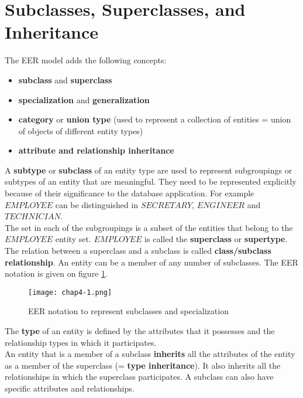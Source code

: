 \section{Subclasses, Superclasses, and Inheritance}

The EER model adds the following concepts:\\

\begin{itemize}
    \item \textbf{subclass} and \textbf{superclass}
    \item \textbf{specialization} and \textbf{generalization}
    \item \textbf{category} or \textbf{union type} (used to represent a collection of entities = union of objects of different entity types)
    \item \textbf{attribute and relationship inheritance}
\end{itemize}

A \textbf{subtype} or \textbf{subclass} of an entity type are used to represent subgroupings or subtypes of an entity that are meaningful. They need to be represented explicitly because of their significance to the database application. For example $EMPLOYEE$ can be distinguished in $SECRETARY$, $ENGINEER$ and $TECHNICIAN$.\\

The set in each of the subgroupings is a subset of the entities that belong to the $EMPLOYEE$ entity set. $EMPLOYEE$ is called the \textbf{superclass} or \textbf{supertype}. The relation between a superclass and a subclass is called \textbf{class/subclass relationship}. An entity can be a member of any number of subclasses. The EER notation is given on figure \ref{fig:subclasses}.\\

\begin{figure}[!h]
    \centering
    \texttt{[image: chap4-1.png]}
    \caption{EER notation to represent subclasses and specialization}
    \label{fig:subclasses}
\end{figure}

The \textbf{type} of an entity is defined by the attributes that it possesses and the relationship types in which it participates.\\

An entity that is a member of a subclass \textbf{inherits} all the attributes of the entity as a member of the superclass (= \textbf{type inheritance}). It also inherits all the relationships in which the superclass participates. A subclass can also have specific attributes and relationships.

